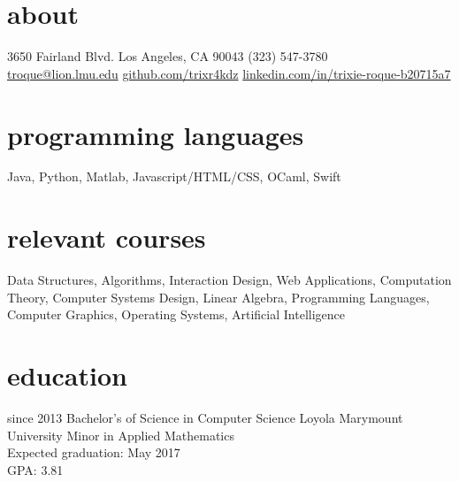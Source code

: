 \documentclass[]{friggeri-cv} %
\begin{document}


\begin{aside} %
  \section{about}
    3650 Fairland Blvd.
    Los Angeles, CA 90043
    (323) 547-3780
    ~
    \href{mailto:troque@lion.lmu.edu}{troque@lion.lmu.edu}
    \href{http://github.com/trixr4kdz}{github.com/trixr4kdz}
    \href{http://linkedin.com/in/trixie-roque-b20715a7}{linkedin.com/in/trixie-roque-b20715a7}
  \section{programming languages}
    Java, Python, Matlab, Javascript/HTML/CSS, OCaml, Swift
  \section{relevant courses}
     Data Structures,
     Algorithms,
     Interaction Design,
     Web Applications,
     Computation Theory,
     Computer Systems Design,
     Linear Algebra,
     Programming Languages,
     Computer Graphics,
     Operating Systems,
     Artificial Intelligence
\end{aside}


\section{education}

  \begin{entrylist}


    \entry
      {since 2013}
      {Bachelor's of Science {\normalfont in Computer Science}}
      {Loyola Marymount University}
      {Minor {\normalfont in Applied Mathematics} \\ 
      Expected graduation: May 2017 \\
      GPA: 3.81}


\end{entrylist}
\end{document}
